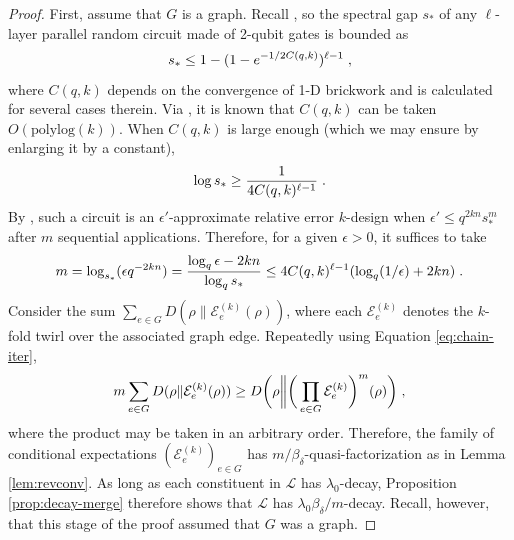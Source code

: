 \documentclass[11pt,reqno]{amsart}
\newcommand{\E}{\mathcal{E}}
\newcommand{\pl}{\hspace{.1cm}}
\renewcommand{\L}{\mathcal{L}}
\begin{document}
\begin{proof}
    First, assume that $G$ is a graph. Recall \cite[Equation (51)]{belkin_approximate_2024}, so the spectral gap $s_*$ of any $\ell$-layer parallel random circuit made of 2-qubit gates is bounded as
    \begin{equation}
        s_* \leq 1 - (1 - e^{-1/2 C(q,k)})^{\ell - 1} \pl,
    \end{equation}
    where $C(q,k)$ depends on the convergence of 1-D brickwork and is calculated for several cases therein.  Via \cite{chen_incompressibility_2024}, it is known that $C(q,k)$ can be taken $O(\mathrm{polylog}(k))$.
    When $C(q,k)$ is large enough (which we may ensure by enlarging it by a constant),
    \begin{equation}
        \log s_* \geq \frac{1}{4 C(q,k)^{\ell - 1}} \pl.
    \end{equation}
    By \cite[Lemma 3]{brandao_local_2016}, such a circuit is an $\epsilon'$-approximate relative error $k$-design when $\epsilon' \leq q^{2 k n} s_*^m$ after $m$ sequential applications. Therefore, for a given $\epsilon > 0$, it suffices to take
    \begin{equation} \label{eq:circuit-depth-base}
        m = \log_{s_*} (\epsilon q^{- 2 k n}) = \frac{\log_q \epsilon - 2 k n}{\log_q s_*} \leq 4 C(q,k)^{\ell - 1} (\log_q (1/\epsilon) + 2 k n) \pl.
    \end{equation}
   Consider the sum $\sum_{e \in G} D(\rho \| \E_e^{(k)}(\rho))$, where each $\E_e^{(k)}$ denotes the $k$-fold twirl over the associated graph edge. Repeatedly using Equation \eqref{eq:chain-iter},
   \begin{equation} \label{eq:quasifac-graph}
       m \sum_{e \in G} D(\rho \| \E_e^{(k)}(\rho)) \geq D \bigg ( \rho \bigg \| \bigg ( \prod_{e \in G} \E_e^{(k)} \bigg )^m (\rho) \bigg ) \pl ,
   \end{equation}
   where the product may be taken in an arbitrary order. Therefore, the family of conditional expectations $(\E_e^{(k)})_{e \in G}$ has $m/\beta_{\delta}$-quasi-factorization as in Lemma \ref{lem:revconv}. As long as each constituent in $\L$ has $\lambda_0$-decay, Proposition \ref{prop:decay-merge} therefore shows that $\L$ has $\lambda_0 \beta_{\delta}/m$-decay. Recall, however, that this stage of the proof assumed that $G$ was a graph.
    

\end{proof}
\end{document}
